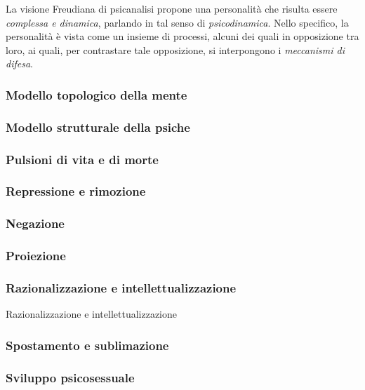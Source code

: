 \documentclass{subfiles}
\begin{document}
La visione Freudiana di psicanalisi propone una personalità che risulta essere \emph{complessa \emph{e} dinamica},
parlando in tal senso di \emph{psicodinamica}. Nello specifico, la personalità è vista come un insieme di processi,
alcuni dei quali in opposizione tra loro, ai quali, per contrastare tale opposizione, si interpongono i \emph{meccanismi di difesa}.

\subsubsection{Modello topologico della mente}


\subsubsection{Modello strutturale della psiche}


\subsubsection{Pulsioni di vita e di morte}


\subsubsection{Repressione e rimozione}


\subsubsection{Negazione}


\subsubsection{Proiezione}


\subsubsection{Razionalizzazione e intellettualizzazione} Razionalizzazione e intellettualizzazione


\subsubsection{Spostamento e sublimazione}


\subsubsection{Sviluppo psicosessuale}

\end{document}
